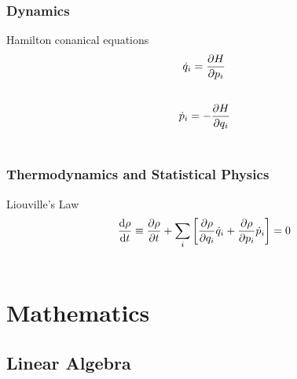 \documentclass[letterpaper,10pt,english]{sphinxmanual}
\begin{document}
\subsubsection{Dynamics}
\label{Basic:dynamics}
Hamilton conanical equations
\begin{gather}
\begin{split}\dot q_i = \frac{\partial H}{\partial p_i}\end{split}\notag\\\begin{split}\end{split}\notag
\end{gather}\begin{gather}
\begin{split}\dot p_i = - \frac{\partial H}{\partial q_i}\end{split}\notag\\\begin{split}\end{split}\notag
\end{gather}

\subsubsection{Thermodynamics and Statistical Physics}
\label{Basic:thermodynamics-and-statistical-physics}
Liouville's Law
\begin{gather}
\begin{split}\frac{\mathrm d \rho}{\mathrm d t}\equiv \frac{\partial \rho}{\partial t} + \sum_i \left[ \frac{\partial \rho}{\partial q_i}\dot q_i + \frac{\partial \rho}{\partial p_i}\dot p_i \right] = 0\end{split}\notag\\\begin{split}\end{split}\notag
\end{gather}

\section{Mathematics}
\label{math:mathematics}\label{math::doc}

\subsection{Linear Algebra}
\label{math:linear-algebra}
\end{document}

